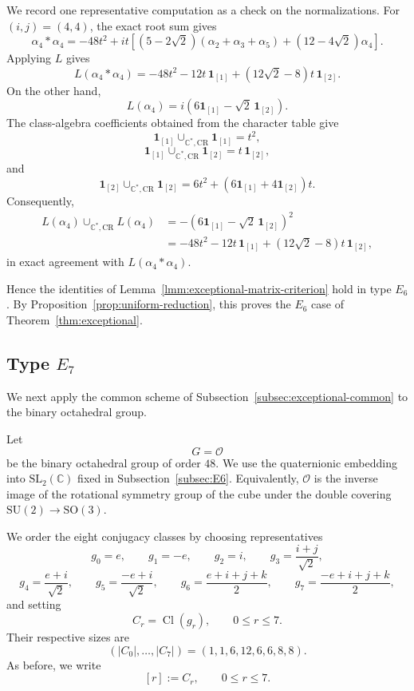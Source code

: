 \documentclass[a4paper,reqno]{amsart}
\theoremstyle{plain} %
\theoremstyle{definition} %
\theoremstyle{remark} %
\newcommand{\1}{\mathds{1}}   %
\begin{document}
We record one representative computation as a check on the
normalizations.  For \((i,j)=(4,4)\), the exact root sum gives
\[
\alpha_4*\alpha_4
=
-48t^2
+
it\left[
(5-2\sqrt2)(\alpha_2+\alpha_3+\alpha_5)
+
(12-4\sqrt2)\alpha_4
\right].
\]
Applying \(L\) gives
\[
L(\alpha_4*\alpha_4)
=
-48t^2
-12t\,\mathbf1_{[1]}
+
(12\sqrt2-8)t\,\mathbf1_{[2]}.
\]
On the other hand,
\[
L(\alpha_4)
=
i\left(
6\mathbf1_{[1]}
-
\sqrt2\,\mathbf1_{[2]}
\right).
\]
The class-algebra coefficients obtained from the character table give
\[
\mathbf1_{[1]}
\cup_{\mathbb C^*,\mathrm{CR}}
\mathbf1_{[1]}
=
t^2,
\]
\[
\mathbf1_{[1]}
\cup_{\mathbb C^*,\mathrm{CR}}
\mathbf1_{[2]}
=
t\,\mathbf1_{[2]},
\]
and
\[
\mathbf1_{[2]}
\cup_{\mathbb C^*,\mathrm{CR}}
\mathbf1_{[2]}
=
6t^2+
\left(
6\mathbf1_{[1]}+4\mathbf1_{[2]}
\right)t.
\]
Consequently,
\[
\begin{aligned}
L(\alpha_4)
\cup_{\mathbb C^*,\mathrm{CR}}
L(\alpha_4)
&=
-
\left(
6\mathbf1_{[1]}
-\sqrt2\,\mathbf1_{[2]}
\right)^2\\
&=
-48t^2
-12t\,\mathbf1_{[1]}
+
(12\sqrt2-8)t\,\mathbf1_{[2]},
\end{aligned}
\]
in exact agreement with \(L(\alpha_4*\alpha_4)\).

Hence the identities of
Lemma~\ref{lmm:exceptional-matrix-criterion} hold in type \(E_6\).
By Proposition~\ref{prop:uniform-reduction}, this proves the \(E_6\) case of
Theorem~\ref{thm:exceptional}.



\subsection{Type \(E_7\)}
\label{subsec:E7}

We next apply the common scheme of
Subsection~\ref{subsec:exceptional-common} to the binary octahedral
group.

Let
\[
G=\mathcal O
\]
be the binary octahedral group of order \(48\).  We use the quaternionic
embedding into \(\mathrm{SL}_2(\mathbb C)\) fixed in
Subsection~\ref{subsec:E6}.  Equivalently, \(\mathcal O\) is the inverse
image of the rotational symmetry group of the cube under the double
covering $\mathrm{SU}(2)\longrightarrow\mathrm{SO}(3)$.

We order the eight conjugacy classes by choosing representatives
\[
g_0=e,
\qquad
g_1=-e,
\qquad
g_2=i,
\qquad
g_3=\frac{i+j}{\sqrt2},
\]
\[
g_4=\frac{e+i}{\sqrt2},
\qquad
g_5=\frac{-e+i}{\sqrt2},
\qquad
g_6=\frac{e+i+j+k}{2},
\qquad
g_7=\frac{-e+i+j+k}{2},
\]
and setting
\[
C_r=\operatorname{Cl}(g_r),
\qquad
0\le r\le7.
\]
Their respective sizes are
\[
(|C_0|,\ldots,|C_7|)
=
(1,1,6,12,6,6,8,8).
\]
As before, we write
\[
[r]:=C_r,
\qquad
0\le r\le7.
\]
\end{document}
